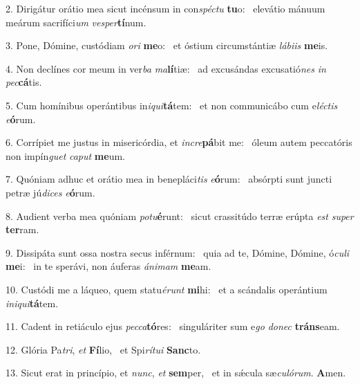 2. Dirigátur orátio mea sicut incénsum in con\textit{spéc}\textit{tu} \textbf{tu}o: \ast\  elevátio mánuum meárum sacrifíci\textit{um} \textit{ves}\textit{per}\textbf{tí}num.\

3. Pone, Dómine, custódiam \textit{o}\textit{ri} \textbf{me}o: \ast\  et óstium circumstántiæ \textit{lá}\textit{bi}\textit{is} \textbf{me}is.\

4. Non declínes cor meum in ver\textit{ba} \textit{ma}\textbf{lí}tiæ: \ast\  ad excusándas excusatió\textit{nes} \textit{in} \textit{pec}\textbf{cá}tis.\

5. Cum homínibus operántibus in\textit{i}\textit{qui}\textbf{tá}tem: \ast\  et non communicábo cum e\textit{léc}\textit{tis} \textit{e}\textbf{ó}rum.\

6. Corrípiet me justus in misericórdia, et \textit{in}\textit{cre}\textbf{pá}bit me: \ast\  óleum autem peccatóris non impín\textit{guet} \textit{ca}\textit{put} \textbf{me}um.\

7. Quóniam adhuc et orátio mea in benepláci\textit{tis} \textit{e}\textbf{ó}rum: \ast\  absórpti sunt juncti petræ jú\textit{di}\textit{ces} \textit{e}\textbf{ó}rum.\

8. Audient verba mea quóniam \textit{pot}\textit{u}\textbf{é}runt: \ast\  sicut crassitúdo terræ erúpta \textit{est} \textit{su}\textit{per} \textbf{ter}ram.\

9. Dissipáta sunt ossa nostra secus inférnum: \dag\  quia ad te, Dómine, Dómine, ó\textit{cu}\textit{li} \textbf{me}i: \ast\  in te sperávi, non áuferas \textit{á}\textit{ni}\textit{mam} \textbf{me}am.\

10. Custódi me a láqueo, quem statu\textit{é}\textit{runt} \textbf{mi}hi: \ast\  et a scándalis operántium \textit{in}\textit{i}\textit{qui}\textbf{tá}tem.\

11. Cadent in retiáculo ejus \textit{pec}\textit{ca}\textbf{tó}res: \ast\  singuláriter sum e\textit{go} \textit{do}\textit{nec} \textbf{tráns}eam.\

12. Glória Pa\textit{tri}, \textit{et} \textbf{Fí}lio, \ast\  et Spi\textit{rí}\textit{tu}\textit{i} \textbf{Sanc}to.\

13. Sicut erat in princípio, et \textit{nunc}, \textit{et} \textbf{sem}per, \ast\  et in sǽcula sæ\textit{cu}\textit{ló}\textit{rum}. \textbf{A}men.\

